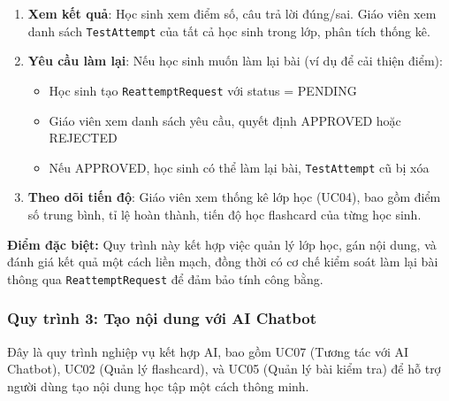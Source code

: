\documentclass[../DoAn.tex]{subfiles}
\begin{document}
\begin{enumerate}
\begin{itemize}
        \item Học sinh trả lời các câu hỏi trong thời gian quy định
        \item Nộp bài, hệ thống tự động chấm điểm (trừ câu ESSAY)
    \end{itemize}
    \item \textbf{Xem kết quả}: Học sinh xem điểm số, câu trả lời đúng/sai. Giáo viên xem danh sách \texttt{TestAttempt} của tất cả học sinh trong lớp, phân tích thống kê.
    \item \textbf{Yêu cầu làm lại}: Nếu học sinh muốn làm lại bài (ví dụ để cải thiện điểm):
    \begin{itemize}
        \item Học sinh tạo \texttt{ReattemptRequest} với status = PENDING
        \item Giáo viên xem danh sách yêu cầu, quyết định APPROVED hoặc REJECTED
        \item Nếu APPROVED, học sinh có thể làm lại bài, \texttt{TestAttempt} cũ bị xóa
    \end{itemize}
    \item \textbf{Theo dõi tiến độ}: Giáo viên xem thống kê lớp học (UC04), bao gồm điểm số trung bình, tỉ lệ hoàn thành, tiến độ học flashcard của từng học sinh.
\end{enumerate}

\textbf{Điểm đặc biệt:} Quy trình này kết hợp việc quản lý lớp học, gán nội dung, và đánh giá kết quả một cách liền mạch, đồng thời có cơ chế kiểm soát làm lại bài thông qua \texttt{ReattemptRequest} để đảm bảo tính công bằng.

\subsubsection{Quy trình 3: Tạo nội dung với AI Chatbot}

Đây là quy trình nghiệp vụ kết hợp AI, bao gồm UC07 (Tương tác với AI Chatbot), UC02 (Quản lý flashcard), và UC05 (Quản lý bài kiểm tra) để hỗ trợ người dùng tạo nội dung học tập một cách thông minh.
\end{document}
